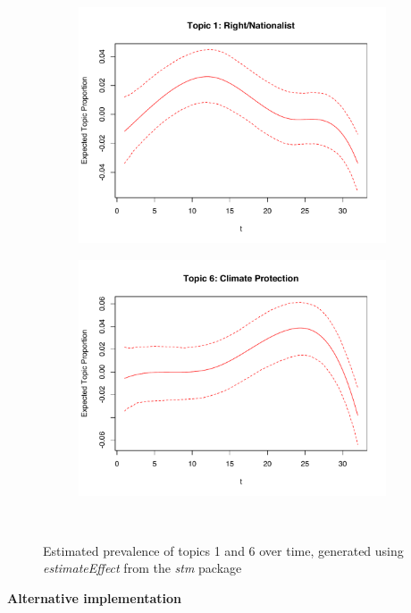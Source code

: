 \begin{figure}[h!]
  \centering
  \captionsetup{justification=centering,margin=2cm}
  \begin{subfigure}[b]{0.4\linewidth}
    \includegraphics[width=\linewidth]{../plots/5_1/estEffect_topic1.pdf}
  \end{subfigure}
  \begin{subfigure}[b]{0.4\linewidth}
    \includegraphics[width=\linewidth]{../plots/5_1/estEffect_topic6.pdf}
  \end{subfigure}\\
  \caption{Estimated prevalence of topics 1 and 6 over time, generated using \textit{estimateEffect} from the \textit{stm} package}
  \label{fig:estEffect_topic16}
\end{figure}
\noindent \textbf{Alternative implementation} \vspace{10px}

